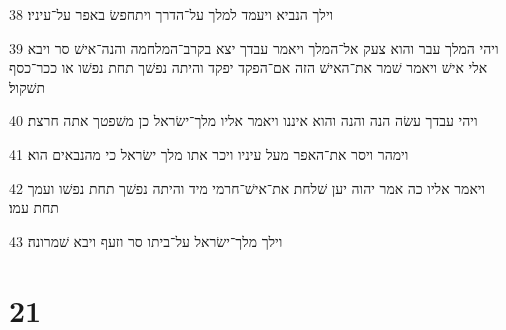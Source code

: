 \par 38 וילך הנביא ויעמד למלך על־הדרך ויתחפשׂ באפר על־עיניו׃
\par 39 ויהי המלך עבר והוא צעק אל־המלך ויאמר עבדך יצא בקרב־המלחמה והנה־אישׁ סר ויבא אלי אישׁ ויאמר שׁמר את־האישׁ הזה אם־הפקד יפקד והיתה נפשׁך תחת נפשׁו או ככר־כסף תשׁקול׃
\par 40 ויהי עבדך עשׂה הנה והנה והוא איננו ויאמר אליו מלך־ישׂראל כן משׁפטך אתה חרצת׃
\par 41 וימהר ויסר את־האפר מעל עיניו ויכר אתו מלך ישׂראל כי מהנבאים הוא׃
\par 42 ויאמר אליו כה אמר יהוה יען שׁלחת את־אישׁ־חרמי מיד והיתה נפשׁך תחת נפשׁו ועמך תחת עמו׃
\par 43 וילך מלך־ישׂראל על־ביתו סר וזעף ויבא שׁמרונה׃

\chapter{21}

